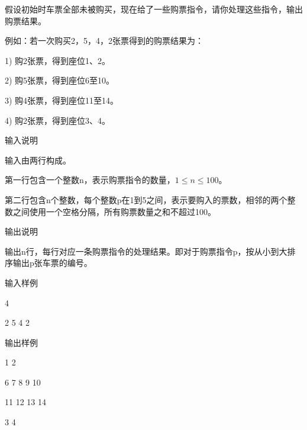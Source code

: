 假设初始时车票全部未被购买，现在给了一些购票指令，请你处理这些指令，输出购票结果。 

例如：若一次购买2，5，4，2张票得到的购票结果为： 

1) 购2张票，得到座位1、2。 

2) 购5张票，得到座位6至10。 

3) 购4张票，得到座位11至14。 

4) 购2张票，得到座位3、4。 

输入说明

输入由两行构成。 

第一行包含一个整数n，表示购票指令的数量，$1\le n\le 100$。 

第二行包含n个整数，每个整数p在1到5之间，表示要购入的票数，相邻的两个整数之间使用一个空格分隔，所有购票数量之和不超过100。 

输出说明

输出n行，每行对应一条购票指令的处理结果。即对于购票指令p，按从小到大排序输出p张车票的编号。 

输入样例

4 

2 5 4 2 

输出样例

1 2 

6 7 8 9 10 

11 12 13 14 

3 4 

